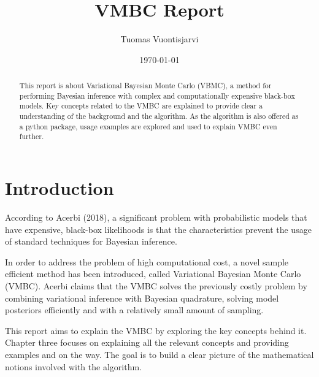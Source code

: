 \documentclass[english,oneside,openany]{UH_DS_report}
\title{VMBC Report}
\author{Tuomas Vuontisjarvi}
\date{\today}
\begin{document}
\maketitle


\begin{abstract}
This report is about Variational Bayesian Monte Carlo (VBMC), a method for performing 
Bayesian inference with complex and computationally expensive black-box models. Key concepts
related to the VMBC are explained to provide clear a understanding of the background and the algorithm.
As the algorithm is also offered as a python package, usage examples are explored and used to explain 
VMBC even further.
\end{abstract}

\mytableofcontents

\mynomenclature


\chapter{Introduction}
\label{chapter:intro}

According to Acerbi (2018), a significant problem with probabilistic models that have expensive,
black-box likelihoods is that the characteristics prevent the usage of standard techniques for 
Bayesian inference.

In order to address the problem of high computational cost, a novel sample efficient method 
has been introduced, called Variational Bayesian Monte Carlo (VMBC). 
Acerbi claims that the VMBC solves the previously costly problem by combining 
variational inference with Bayesian quadrature, solving model posteriors efficiently 
and with a relatively small amount of sampling\cite{acerbi2018}.

This report aims to explain the VMBC by exploring the key concepts behind it. 
Chapter three focuses on explaining all the relevant concepts and providing examples 
and on the way. The goal is to build a clear picture of the mathematical notions involved with the algorithm.
\end{document}
